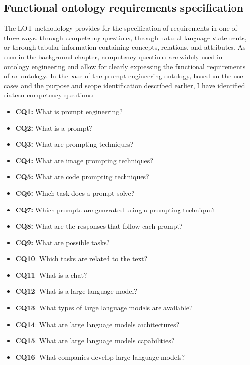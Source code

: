 \subsection{Functional ontology requirements specification}
The LOT methodology provides for the specification of requirements in one of three ways: through competency questions, through natural language statements, or through tabular information containing concepts, relations, and attributes. As seen in the background chapter, competency questions are widely used in ontology engineering and allow for clearly expressing the functional requirements of an ontology. In the case of the prompt engineering ontology, based on the use cases and the purpose and scope identification described earlier, I have identified sixteen competency questions:
\begin{itemize}
    \item \textbf{CQ1:} What is prompt engineering?

    \item \textbf{CQ2:} What is a prompt?

    \item \textbf{CQ3:} What are prompting techniques?

    \item \textbf{CQ4:} What are image prompting techniques?

    \item \textbf{CQ5:} What are code prompting techniques?

    \item \textbf{CQ6:} Which task does a prompt solve?

    \item \textbf{CQ7:} Which prompts are generated using a prompting technique?

    \item \textbf{CQ8:} What are the responses that follow each prompt?

    \item \textbf{CQ9:} What are possible tasks?

    \item \textbf{CQ10:} Which tasks are related to the text?

    \item \textbf{CQ11:} What is a chat?

    \item \textbf{CQ12:} What is a large language model?

    \item \textbf{CQ13:} What types of large language models are available?

    \item \textbf{CQ14:} What are large language models architectures?

    \item \textbf{CQ15:} What are large language models capabilities?

    \item \textbf{CQ16:} What companies develop large language models?
\end{itemize}

